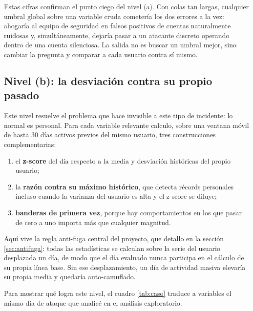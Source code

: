 \documentclass[12pt, a4paper]{article}
\begin{document}
Estas cifras confirman el punto ciego del nivel (a). Con colas tan largas, cualquier umbral global
sobre una variable cruda cometería los dos errores a la vez: ahogaría al equipo de seguridad en
falsos positivos de cuentas naturalmente ruidosas y, simultáneamente, dejaría pasar a un atacante
discreto operando dentro de una cuenta silenciosa. La salida no es buscar un umbral mejor, sino
cambiar la pregunta y comparar a cada usuario contra sí mismo.

\subsection{Nivel (b): la desviación contra su propio pasado}

Este nivel resuelve el problema que hace invisible a este tipo de incidente: lo normal es personal.
Para cada variable relevante calculo, sobre una ventana móvil de hasta 30 días activos previos del
mismo usuario, tres construcciones complementarias:

\begin{enumerate}[leftmargin=1.2cm, itemsep=2pt]
  \item el \textbf{z-score} del día respecto a la media y desviación históricas del propio usuario;
  \item la \textbf{razón contra su máximo histórico}, que detecta récords personales incluso cuando
        la varianza del usuario es alta y el z-score se diluye;
  \item \textbf{banderas de primera vez}, porque hay comportamientos en los que pasar de cero a uno
        importa más que cualquier magnitud.
\end{enumerate}

Aquí vive la regla anti-fuga central del proyecto, que detallo en la sección \ref{sec:antifuga}:
todas las estadísticas se calculan sobre la serie del usuario desplazada un día, de modo que el día
evaluado nunca participa en el cálculo de su propia línea base. Sin ese desplazamiento, un día de
actividad masiva elevaría su propia media y quedaría auto-camuflado.

Para mostrar qué logra este nivel, el cuadro \ref{tab:caso} traduce a variables el mismo día de
ataque que analicé en el análisis exploratorio.
\end{document}
